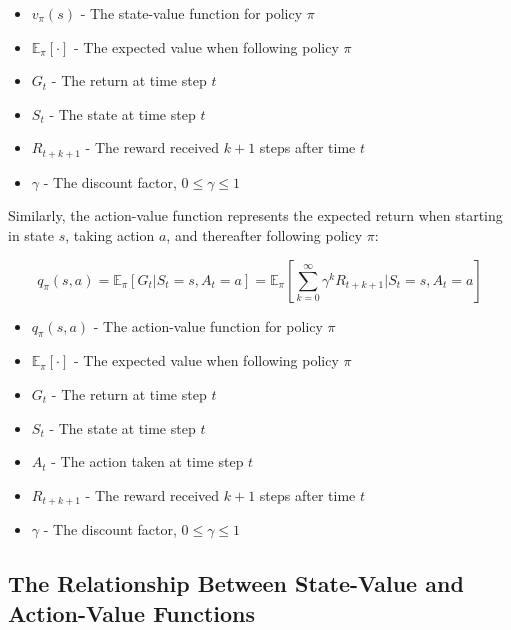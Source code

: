 \documentclass[12pt,a4paper]{article}
\begin{document}
\begin{tcolorbox}[title=Notation Overview]
\begin{itemize}
    \item $v_{\pi}(s)$ - The state-value function for policy $\pi$
    \item $\mathbb{E}_{\pi}[\cdot]$ - The expected value when following policy $\pi$
    \item $G_t$ - The return at time step $t$
    \item $S_t$ - The state at time step $t$
    \item $R_{t+k+1}$ - The reward received $k+1$ steps after time $t$
    \item $\gamma$ - The discount factor, $0 \leq \gamma \leq 1$
\end{itemize}
\end{tcolorbox}

Similarly, the action-value function represents the expected return when starting in state $s$, taking action $a$, and thereafter following policy $\pi$:

\begin{equation}
q_{\pi}(s,a) = \mathbb{E}_{\pi}[G_t|S_t = s, A_t = a] = \mathbb{E}_{\pi}\left[\sum_{k=0}^{\infty} \gamma^k R_{t+k+1} \bigg| S_t = s, A_t = a\right]
\end{equation}

\begin{tcolorbox}[title=Notation Overview]
\begin{itemize}
    \item $q_{\pi}(s,a)$ - The action-value function for policy $\pi$
    \item $\mathbb{E}_{\pi}[\cdot]$ - The expected value when following policy $\pi$
    \item $G_t$ - The return at time step $t$
    \item $S_t$ - The state at time step $t$
    \item $A_t$ - The action taken at time step $t$
    \item $R_{t+k+1}$ - The reward received $k+1$ steps after time $t$
    \item $\gamma$ - The discount factor, $0 \leq \gamma \leq 1$
\end{itemize}
\end{tcolorbox}

\subsection{The Relationship Between State-Value and Action-Value Functions}
\end{document}
